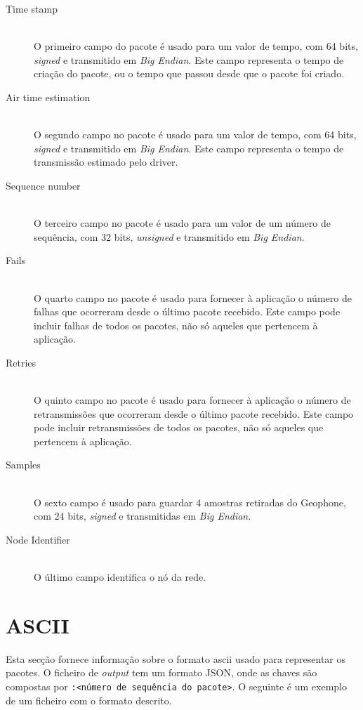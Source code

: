 \documentclass[10pt,a4paper,oneside]{book}
\begin{document}
 \begin{description}
   \item[Time stamp]\hfill\\
   	O primeiro campo do pacote é usado para um valor de tempo, com 64 bits, \emph{signed} e transmitido em \emph{Big Endian}. Este campo representa o tempo de criação do pacote, ou o tempo que passou desde que o pacote foi criado.
   \item[Air time estimation]\hfill\\
   	O segundo campo no pacote é usado para um valor de tempo, com 64 bits, \emph{signed} e transmitido em \emph{Big Endian}. Este campo representa o tempo de transmissão estimado pelo driver.
   \item[Sequence number]\hfill\\
   	O terceiro campo no pacote é usado para um valor de um número de sequência, com 32 bits, \emph{unsigned} e transmitido em \emph{Big Endian}.
   \item[Fails]\hfill\\
         O quarto campo no pacote é usado para fornecer à aplicação o número de falhas que ocorreram desde o último pacote recebido. Este campo pode incluir falhas de todos os pacotes, não só aqueles que pertencem à aplicação.
   \item[Retries]\hfill\\
         O quinto campo no pacote é usado para fornecer à aplicação o número de retransmissões que ocorreram desde o último pacote recebido. Este campo pode incluir retransmissões de todos os pacotes, não só aqueles que pertencem à aplicação.
   \item[Samples]\hfill\\
     O sexto campo é usado para guardar 4 amostras retiradas do Geophone, com 24 bits, \emph{signed} e transmitidas em \emph{Big Endian}.
    \item[Node Identifier]\hfill\\
	O último campo identifica o nó da rede.
 \end{description}

  \section{ASCII}
  
  	Esta secção fornece informação sobre o formato ascii usado para representar os pacotes. O ficheiro de \emph{output} tem um formato JSON, onde as chaves são compostas por {\tt <identificador do nó>:<número de sequência do pacote>}. O seguinte é um exemplo de um ficheiro com o formato descrito.
\end{document}

